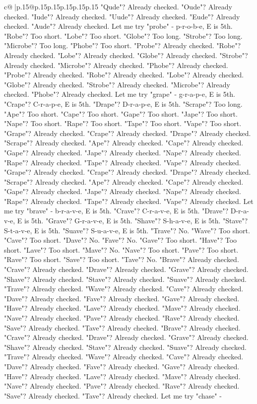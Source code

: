 \documentclass{article}
\begin{document}
{\begin{supertabular}{c@{$\;$}|p{.15\linewidth}@{}p{.15\linewidth}p{.15\linewidth}p{.15\linewidth}p{.15\linewidth}p{.15\linewidth}}
{{{"Qude"? Already checked. "Oude"? Already checked. "Iude"? Already checked. "Uude"? Already checked. "Eude"? Already checked. "Aude"? Already checked. Let me try "probe" {-} p{-}r{-}o{-}b{-}e, E is 5th. "Robe"? Too short. "Lobe"? Too short. "Globe"? Too long. "Strobe"? Too long. "Microbe"? Too long. "Phobe"? Too short. "Probe"? Already checked. "Robe"? Already checked. "Lobe"? Already checked. "Globe"? Already checked. "Strobe"? Already checked. "Microbe"? Already checked. "Phobe"? Already checked. "Probe"? Already checked. "Robe"? Already checked. "Lobe"? Already checked. "Globe"? Already checked. "Strobe"? Already checked. "Microbe"? Already checked. "Phobe"? Already checked. Let me try "grape" {-} g{-}r{-}a{-}p{-}e, E is 5th. "Crape"? C{-}r{-}a{-}p{-}e, E is 5th. "Drape"? D{-}r{-}a{-}p{-}e, E is 5th. "Scrape"? Too long. "Ape"? Too short. "Cape"? Too short. "Gape"? Too short. "Jape"? Too short. "Nape"? Too short. "Rape"? Too short. "Tape"? Too short. "Vape"? Too short. "Grape"? Already checked. "Crape"? Already checked. "Drape"? Already checked. "Scrape"? Already checked. "Ape"? Already checked. "Cape"? Already checked. "Gape"? Already checked. "Jape"? Already checked. "Nape"? Already checked. "Rape"? Already checked. "Tape"? Already checked. "Vape"? Already checked. "Grape"? Already checked. "Crape"? Already checked. "Drape"? Already checked. "Scrape"? Already checked. "Ape"? Already checked. "Cape"? Already checked. "Gape"? Already checked. "Jape"? Already checked. "Nape"? Already checked. "Rape"? Already checked. "Tape"? Already checked. "Vape"? Already checked. Let me try "brave" {-} b{-}r{-}a{-}v{-}e, E is 5th. "Crave"? C{-}r{-}a{-}v{-}e, E is 5th. "Drave"? D{-}r{-}a{-}v{-}e, E is 5th. "Grave"? G{-}r{-}a{-}v{-}e, E is 5th. "Shave"? S{-}h{-}a{-}v{-}e, E is 5th. "Stave"? S{-}t{-}a{-}v{-}e, E is 5th. "Suave"? S{-}u{-}a{-}v{-}e, E is 5th. "Trave"? No. "Wave"? Too short. "Cave"? Too short. "Dave"? No. "Fave"? No. "Gave"? Too short. "Have"? Too short. "Lave"? Too short. "Mave"? No. "Nave"? Too short. "Pave"? Too short. "Rave"? Too short. "Save"? Too short. "Tave"? No. "Brave"? Already checked. "Crave"? Already checked. "Drave"? Already checked. "Grave"? Already checked. "Shave"? Already checked. "Stave"? Already checked. "Suave"? Already checked. "Trave"? Already checked. "Wave"? Already checked. "Cave"? Already checked. "Dave"? Already checked. "Fave"? Already checked. "Gave"? Already checked. "Have"? Already checked. "Lave"? Already checked. "Mave"? Already checked. "Nave"? Already checked. "Pave"? Already checked. "Rave"? Already checked. "Save"? Already checked. "Tave"? Already checked. "Brave"? Already checked. "Crave"? Already checked. "Drave"? Already checked. "Grave"? Already checked. "Shave"? Already checked. "Stave"? Already checked. "Suave"? Already checked. "Trave"? Already checked. "Wave"? Already checked. "Cave"? Already checked. "Dave"? Already checked. "Fave"? Already checked. "Gave"? Already checked. "Have"? Already checked. "Lave"? Already checked. "Mave"? Already checked. "Nave"? Already checked. "Pave"? Already checked. "Rave"? Already checked. "Save"? Already checked. "Tave"? Already checked. Let me try "chase" {-} }}}
\end{supertabular}}
\end{document}
